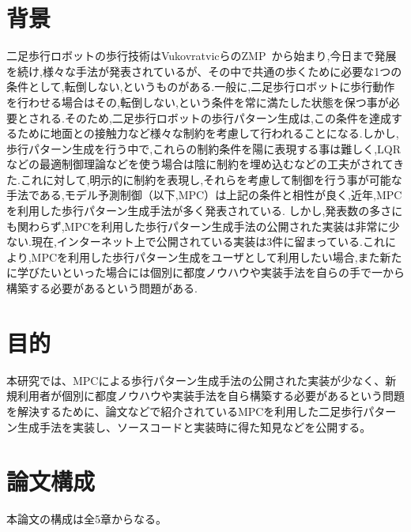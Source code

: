 
\section{背景}
二足歩行ロボットの歩行技術はVukovratvicらのZMP~\cite{VUKOBRATOVIC19721}から始まり,今日まで発展を続け,様々な手法が発表されているが、その中で共通の歩くために必要な1つの条件として,転倒しない,というものがある.一般に,二足歩行ロボットに歩行動作を行わせる場合はその,転倒しない,という条件を常に満たした状態を保つ事が必要とされる.そのため,二足歩行ロボットの歩行パターン生成は,この条件を達成するために地面との接触力など様々な制約を考慮して行われることになる.しかし,歩行パターン生成を行う中で,これらの制約条件を陽に表現する事は難しく,LQRなどの最適制御理論などを使う場合は陰に制約を埋め込むなどの工夫がされてきた.これに対して,明示的に制約を表現し,それらを考慮して制御を行う事が可能な手法である,モデル予測制御（以下,MPC）\cite{57020}は上記の条件と相性が良く,近年,MPCを利用した歩行パターン生成手法が多く発表されている.
しかし,発表数の多さにも関わらず,MPCを利用した歩行パターン生成手法の公開された実装は非常に少ない.現在,インターネット上で公開されている実装は3件\cite{github1}\cite{github2}\cite{github3}に留まっている.これにより,MPCを利用した歩行パターン生成をユーザとして利用したい場合,また新たに学びたいといった場合には個別に都度ノウハウや実装手法を自らの手で一から構築する必要があるという問題がある.

\section{目的}
本研究では、MPCによる歩行パターン生成手法の公開された実装が少なく、新規利用者が個別に都度ノウハウや実装手法を自ら構築する必要があるという問題を解決するために、論文などで紹介されているMPCを利用した二足歩行パターン生成手法を実装し、ソースコードと実装時に得た知見などを公開する。

\section{論文構成}
本論文の構成は全5章からなる。


